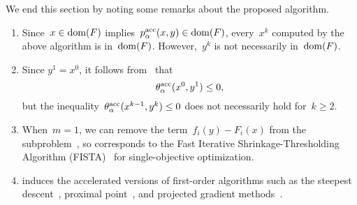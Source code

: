 \documentclass[../main]{subfiles}
\begin{document}
We end this section by noting some remarks about the proposed algorithm.
\begin{remark} 
    \begin{enumerate}
        \item Since~$x \in \operatorname{dom}(F)$ implies~$p^{\mathrm{acc}}_\alpha(x, y) \in \operatorname{dom}(F)$, every~$x^k$ computed by the above algorithm is in~$\operatorname{dom}(F)$.
            However,~$y^k$ is not necessarily in~$\operatorname{dom}(F)$.
        \item Since $y^1 = x^0$, it follows from~ that
            \begin{equation} \label{eq:subprob ineq}
                \theta^{\mathrm{acc}}_\alpha(x^0, y^1) \le 0
            ,\end{equation}
            but the inequality~$\theta^{\mathrm{acc}}_\alpha(x^{k - 1}, y^k) \le 0$ does not necessarily hold for~$k \ge 2$.
        \item When~$m = 1$, we can remove the term~$f_i(y) - F_i(x)$ from the subproblem~, so  corresponds to the Fast Iterative Shrinkage-Thresholding Algorithm (FISTA)~\cite{Beck2009} for single-objective optimization.
        \item {} induces the accelerated versions of first-order algorithms such as the steepest descent~\cite{Fliege2000}, proximal point~\cite{Bonnel2005}, and projected gradient methods~\cite{Grana-Drummond2004}.
    \end{enumerate}
\end{remark}
\end{document}
